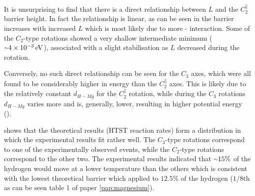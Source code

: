 It is unsurprising to find that there is a direct relationship between $L$ and the $C_2^\parallel$ barrier height.
In fact the relationship is linear, as can be seen in  the barrier increases with increased $L$ which is most likely due to more - interaction.
Some of the $C_2$-type rotations showed a very shallow intermediate minimum ($\mytilde 4\times10^{-3} \unit{eV}$), associated with a slight stabilisation as $L$ decreased during the rotation.

Conversely, no such direct relationship can be seen for the $C_3$ axes, which were all found to be considerably higher in energy than the $C_2^\parallel$ axes.
This is likely due to the relatively constant $d_{H-Mg}$ for the $C_2^\parallel$ rotation, while during the $C_3$ rotations $d_{H-Mg}$ varies more and is, generally, lower, resulting in higher potential energy ().

 shows that the theoretical results (HTST reaction rates) form a distribution in which the experimental results fit rather well.
The $C_3$-type rotations correspond to one of the experimentally observed events, while the $C_2$-type rotations correspond to the other two.
The experimental results indicated that $\mytilde 15\%$ of the hydrogen would move at a lower temperature than the others which is consistent with the lowest theoretical barrier which applied to $12.5\%$ of the hydrogen ($1/8$th as can be seen table 1 of paper \ref{pap:magnesium}).
